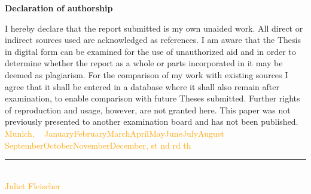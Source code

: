 \documentclass[12pt]{article}
\newcommand{\myname}{\large Juliet Fleischer}
\newcommand{\thesuffix}[1]{%
  \ifnum#1=1 st%
  \else\ifnum#1=2 nd%
  \else\ifnum#1=3 rd%
  \else th%
  \fi\fi\fi}
\newcommand{\mydate}{%
  ~\ifcase\month\or
  January\or February\or March\or April\or May\or June\or July\or August\or
  September\or October\or November\or December\fi, \the\day\thesuffix{\day} \number\year}
\begin{document}
% 


\RaggedRight
% 
% 
\printbibliography
\newpage
\Large
\noindent
\textbf{Declaration of authorship} 
\vspace{0.5cm}
\noindent
\normalsize

I hereby declare that the report submitted is my own unaided work. All direct 
or indirect sources used are acknowledged as references. I am aware that the 
Thesis in digital form can be examined for the use of unauthorized aid and in 
order to determine whether the report as a whole or parts incorporated in it may 
be deemed as plagiarism. For the comparison of my work with existing sources I 
agree that it shall be entered in a database where it shall also remain after 
examination, to enable comparison with future Theses submitted. Further rights 
of reproduction and usage, however, are not granted here. This paper was not 
previously presented to another examination board and has not been published.
\\

\vspace{1cm}
\textcolor{orange}{Munich, \mydate} \\

\vspace{3cm}

\noindent\rule{0.5\textwidth}{0.4pt} \\

\textcolor{orange}{\myname}
\end{document}

